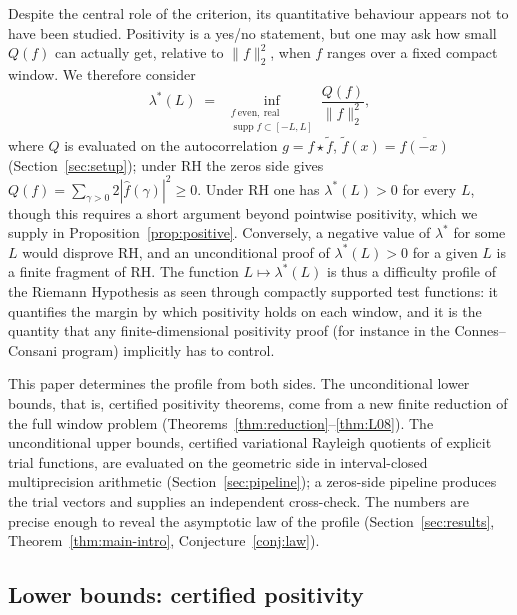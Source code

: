 ﻿\documentclass[11pt]{article}
\newcommand{\supp}{\operatorname{supp}}
\newcommand{\lmin}{\lambda^{*}}
\newcommand{\fhat}{\hat f}
\begin{document}
Despite the central role of the criterion, its quantitative behaviour
appears not to have been studied.  Positivity is a yes/no statement,
but one may ask how small $Q(f)$ can actually get, relative to
$\|f\|_2^2$, when $f$ ranges over a fixed compact window.  We
therefore consider
\begin{equation}\label{eq:lambdastar}
  \lmin(L)\;=\;\inf_{\substack{f\ \mathrm{even,\ real}\\
      \supp f\subset[-L,L]}}
  \frac{Q(f)}{\|f\|_2^2},
\end{equation}
where $Q$ is evaluated on the autocorrelation $g=f\star\tilde f$,
$\tilde f(x)=\overline{f(-x)}$ (Section~\ref{sec:setup}); under RH the
zeros side gives $Q(f)=\sum_{\gamma>0}2|\fhat(\gamma)|^2\ge0$.  Under
RH one has $\lmin(L)>0$ for every $L$, though this requires a short
argument beyond pointwise positivity, which we supply in
Proposition~\ref{prop:positive}.  Conversely, a negative value of
$\lmin$ for some $L$ would disprove RH, and an unconditional proof of
$\lmin(L)>0$ for a given $L$ is a finite fragment of RH.  The function
$L\mapsto\lmin(L)$ is thus a difficulty profile of the Riemann
Hypothesis as seen through compactly supported test functions: it
quantifies the margin by which positivity holds on each window, and it
is the quantity that any finite-dimensional positivity proof (for
instance in the Connes--Consani program) implicitly has to control.

This paper determines the profile from both sides.  The unconditional
lower bounds, that is, certified positivity theorems, come from a new
finite reduction of the full window problem
(Theorems~\ref{thm:reduction}--\ref{thm:L08}).  The unconditional
upper bounds, certified variational Rayleigh quotients of explicit
trial functions, are evaluated on the geometric side in
interval-closed multiprecision arithmetic
(Section~\ref{sec:pipeline}); a zeros-side pipeline produces the
trial vectors and supplies an independent cross-check.  The numbers
are precise enough to reveal the asymptotic law of the profile
(Section~\ref{sec:results}, Theorem~\ref{thm:main-intro},
Conjecture~\ref{conj:law}).

\subsection{Lower bounds: certified positivity}
\end{document}
